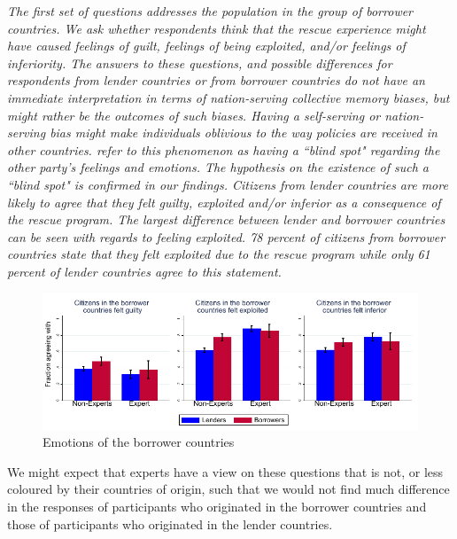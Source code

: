 \textit{The first set of questions addresses the population in the group of borrower
countries. We ask whether respondents think that the rescue experience might
have caused feelings of \textit{guilt}, feelings of \textit{being
exploited}, and/or feelings of \textit{inferiority}. The answers to these
questions, and possible differences for respondents from lender countries or
from borrower countries do not have an immediate interpretation in terms of
nation-serving collective memory biases, but might rather be the outcomes of
such biases. Having a self-serving or nation-serving bias might make individuals oblivious to
the way policies are received in other countries. 
\cite{dezso} refer to this phenomenon as having a ``blind spot" regarding the other party's 
feelings and emotions. The hypothesis on the existence of such a ``blind spot" is confirmed in our findings.
Citizens from lender countries are more likely to agree that they felt guilty, exploited and/or inferior as a 
consequence of the rescue program. The largest difference between lender and borrower countries can be seen with regards to feeling exploited.
78 percent  of citizens from borrower countries state that they felt exploited due to the rescue program while only 61 percent of lender countries
agree to this statement. 
}


\begin{figure}
    \centering
    \caption{Emotions of the borrower countries}
    \includegraphics[scale=1.2]{graph5_1.pdf}
    
    \label{fig:my_label}
\end{figure}

We might expect that experts have a view on these questions that is not, or
less coloured by their countries of origin, such that we would not find much
difference in the responses of participants who originated in the borrower
countries and those of participants who originated in the lender countries.


